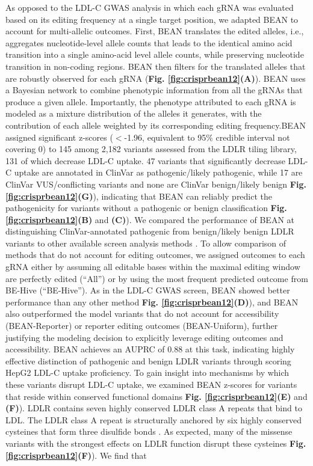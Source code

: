 \documentclass[a4paper, titlepage, openright]{book}
\begin{document}
As opposed to the LDL-C GWAS analysis in which each gRNA was evaluated based on its editing frequency at a single target position, we adapted BEAN to account for multi-allelic outcomes. First, BEAN translates the edited alleles, i.e., aggregates nucleotide-level allele counts that leads to the identical amino acid transition into a single amino-acid level allele counts, while preserving nucleotide transition in non-coding regions. BEAN then filters for the translated alleles that are robustly observed for each gRNA (\textbf{Fig. \ref{fig:crisprbean12}(A)}). BEAN uses a Bayesian network to combine phenotypic information from all the gRNAs that produce a given allele. Importantly, the phenotype attributed to each gRNA is modeled as a mixture distribution of the alleles it generates, with the contribution of each allele weighted by its corresponding editing frequency.BEAN assigned significant z-scores ($<$-1.96, equivalent to 95\% credible interval not covering 0) to 145 among 2,182 variants assessed from the LDLR tiling library, 131 of which decrease LDL-C uptake. 47 variants that significantly decrease LDL-C uptake are annotated in ClinVar as pathogenic/likely pathogenic, while 17 are ClinVar VUS/conflicting variants and none are ClinVar benign/likely benign \textbf{Fig. \ref{fig:crisprbean12}(G)}), indicating that BEAN can reliably predict the pathogenicity for variants without a pathogenic or benign classification \textbf{Fig. \ref{fig:crisprbean12}(B)} and \textbf{(C)}). We compared the performance of BEAN at distinguishing ClinVar-annotated pathogenic from benign/likely benign LDLR variants to other available screen analysis methods \citep{li2014mageck, li2015quality, jeong2019beta, daley2018crisphiermix}. To allow comparison of methods that do not account for editing outcomes, we assigned outcomes to each gRNA either by assuming all editable bases within the maximal editing window are perfectly edited \citep{hanna2021massively} (“All”) or by using the most frequent predicted outcome from BE-Hive \citep{arbab2020determinants}(“BE-Hive”). As in the LDL-C GWAS screen, BEAN showed better performance than any other method \textbf{Fig. \ref{fig:crisprbean12}(D)}), and BEAN also outperformed the model variants that do not account for accessibility (BEAN-Reporter) or reporter editing outcomes (BEAN-Uniform), further justifying the modeling decision to explicitly leverage editing outcomes and accessibility. BEAN achieves an AUPRC of 0.88 at this task, indicating highly effective distinction of pathogenic and benign LDLR variants through scoring HepG2 LDL-C uptake proficiency. To gain insight into mechanisms by which these variants disrupt LDL-C uptake, we examined BEAN z-scores for variants that reside within conserved functional domains \textbf{Fig. \ref{fig:crisprbean12}(E)} and \textbf{(F)}). LDLR contains seven highly conserved LDLR class A repeats that bind to LDL. The LDLR class A repeat is structurally anchored by six highly conserved cysteines that form three disulfide bonds \citep{fass1997molecular}. As expected, many of the missense variants with the strongest effects on LDLR function disrupt these cysteines \textbf{Fig. \ref{fig:crisprbean12}(F)}). We find that 
\end{document}

